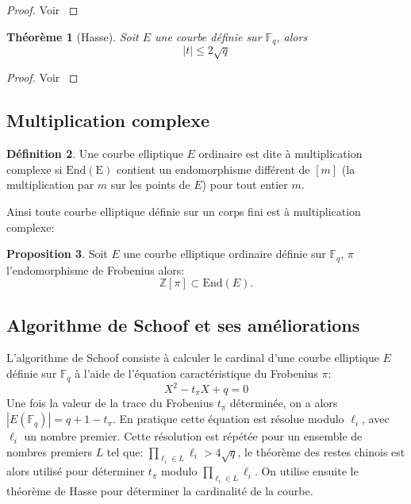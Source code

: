 \documentclass[10pt,a4paper]{book}
\theoremstyle{plain}
\newtheorem{thm}{Théorème}[chapter]
\theoremstyle{definition}
\theoremstyle{definition}
\theoremstyle{definition}
\newtheorem{prop}[thm]{Proposition}
\theoremstyle{definition}
\newtheorem{defi}[thm]{Définition}
\theoremstyle{remark}
\theoremstyle{remark}
\theoremstyle{definition}
\begin{document}
\begin{proof}
Voir \cite[Theorem V.1.1]{Silv1}
\end{proof}

\begin{thm}[Hasse]
Soit $E$ une courbe définie sur $\mathbb{F}_q$, alors 
\begin{equation}
|t| \leqslant 2 \sqrt{q}
\end{equation}
\end{thm}

\begin{proof}
Voir \cite[Theorem V.1.1]{Silv1}
\end{proof}





\subsection{Multiplication complexe}

\begin{defi}
Une courbe elliptique $E$ ordinaire est dite à multiplication complexe si $\mathrm{End(E)}$ contient un endomorphisme différent de $[m]$ (la multiplication par $m$ sur les points de $E$) pour tout entier $m$. 
\end{defi} 

Ainsi toute courbe elliptique définie sur un corps fini est à multiplication complexe:

\begin{prop}
Soit $E$ une courbe elliptique ordinaire définie sur $\mathbb{F}_q$, $\pi$ l'endomorphisme de Frobenius alors: 
\[
\mathbb{Z}[\pi] \subset \mathrm{End}(E).
\]
\end{prop}


\subsection{Algorithme de Schoof et ses améliorations}

L'algorithme de Schoof \cite{Schoof85} consiste à calculer le cardinal d'une courbe elliptique $E$ définie sur $\mathbb{F}_q$ à l'aide de l'équation caractéristique du Frobenius $\pi$:
\begin{equation*}
X^2-t_{\pi}X+q=0
\end{equation*}
Une fois la valeur de la trace du Frobenius $t_{\pi}$ déterminée, on a alors $|E(\mathbb{F}_q)|=q+1-t_{\pi}$. En pratique cette équation est résolue modulo $\ell_i$, avec $\ell_i$ un nombre premier. Cette résolution est répétée pour un ensemble de nombres premiers $L$ tel que: $\prod_{\ell_i \in L}\ell_i>4 \sqrt{q}$, le théorème des restes chinois est alors utilisé pour déterminer $t_{\pi}$ modulo $\prod_{\ell_i \in L}\ell_i$. On utilise ensuite le théorème de Hasse pour déterminer la cardinalité de la courbe.
\end{document}
